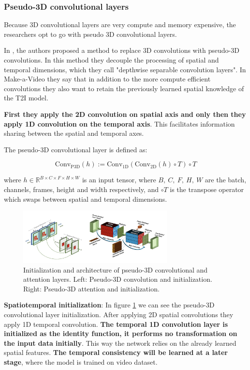 \subsubsection{Pseudo-3D convolutional layers}

Because 3D convolutional layers are very compute and memory expensive, the researchers opt to go with pseudo 3D convolutional layers.

In \cite{chollet2017xception}, the authors proposed a method to replace 3D convolutions with pseudo-3D convolutions. In this method they decouple the processing of spatial and temporal dimensions, which they call "depthwise separable convolution layers". In Make-a-Video they say that in addition to the more compute efficient convolutions they also want to retain the previously learned spatial knowledge of the T2I model.

\textbf{First they apply the 2D convolution on spatial axis and only then they apply 1D convolution on the temporal axis}. This facilitates information sharing between the spatial and temporal axes.

The pseudo-3D convolutional layer is defined as:

\[ 
\text{Conv}_{\text{P3D}} (h) := \text{Conv}_{\text{1D}} (
    \text{Conv}_{\text{2D}} (h) \circ T
) \circ T \]

where $h \in \mathbb{R}^{B\times C\times F\times H\times W}$ is an input tensor, where $B,\ C,\ F,\ H,\ W$ are the batch, channels, frames, height and width respectively, and $\circ T$ is the transpose operator which swaps between spatial and temporal dimensions.

\begin{figure}
    \centering
    \includegraphics[width=0.7\textwidth]{images/make_a_video/pseudo_3d.png}
    \caption{Initialization and architecture of pseudo-3D convolutional and attention layers. Left: Pseudo-3D convolution and initialization. Right: Pseudo-3D attention and initialization.}
    \label{fig:make_a_video_pseudo_3d_conv_and_attention}
\end{figure}

\textbf{Spatiotemporal initialization}: In figure \ref{fig:make_a_video_pseudo_3d_conv_and_attention} we can see the pseudo-3D convolutional layer initialization. After applying 2D spatial convolutions they apply 1D temporal convolution. \textbf{The temporal 1D convolution layer is initialized as the identity function, it performs no transformation on the input data initially}. This way the network relies on the already learned spatial features. \textbf{The temporal consistency will be learned at a later stage}, where the model is trained on video dataset.






